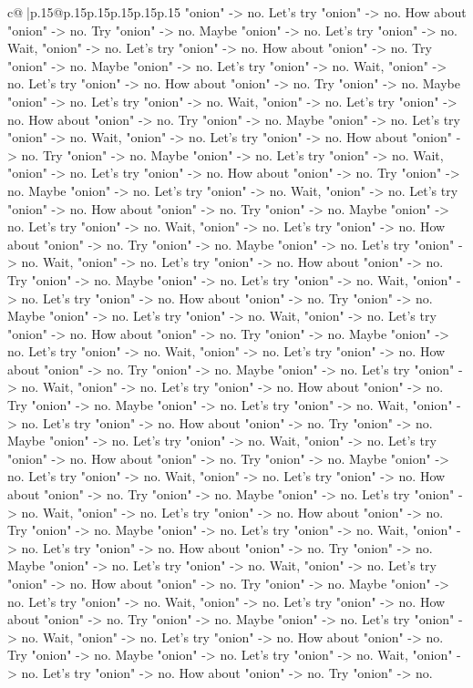 \documentclass{article}
\begin{document}
{\begin{supertabular}{c@{$\;$}|p{.15\linewidth}@{}p{.15\linewidth}p{.15\linewidth}p{.15\linewidth}p{.15\linewidth}p{.15\linewidth}}
{{{"onion" {-}> no. Let's try "onion" {-}> no. How about "onion" {-}> no. Try "onion" {-}> no. Maybe "onion" {-}> no. Let's try "onion" {-}> no. Wait, "onion" {-}> no. Let's try "onion" {-}> no. How about "onion" {-}> no. Try "onion" {-}> no. Maybe "onion" {-}> no. Let's try "onion" {-}> no. Wait, "onion" {-}> no. Let's try "onion" {-}> no. How about "onion" {-}> no. Try "onion" {-}> no. Maybe "onion" {-}> no. Let's try "onion" {-}> no. Wait, "onion" {-}> no. Let's try "onion" {-}> no. How about "onion" {-}> no. Try "onion" {-}> no. Maybe "onion" {-}> no. Let's try "onion" {-}> no. Wait, "onion" {-}> no. Let's try "onion" {-}> no. How about "onion" {-}> no. Try "onion" {-}> no. Maybe "onion" {-}> no. Let's try "onion" {-}> no. Wait, "onion" {-}> no. Let's try "onion" {-}> no. How about "onion" {-}> no. Try "onion" {-}> no. Maybe "onion" {-}> no. Let's try "onion" {-}> no. Wait, "onion" {-}> no. Let's try "onion" {-}> no. How about "onion" {-}> no. Try "onion" {-}> no. Maybe "onion" {-}> no. Let's try "onion" {-}> no. Wait, "onion" {-}> no. Let's try "onion" {-}> no. How about "onion" {-}> no. Try "onion" {-}> no. Maybe "onion" {-}> no. Let's try "onion" {-}> no. Wait, "onion" {-}> no. Let's try "onion" {-}> no. How about "onion" {-}> no. Try "onion" {-}> no. Maybe "onion" {-}> no. Let's try "onion" {-}> no. Wait, "onion" {-}> no. Let's try "onion" {-}> no. How about "onion" {-}> no. Try "onion" {-}> no. Maybe "onion" {-}> no. Let's try "onion" {-}> no. Wait, "onion" {-}> no. Let's try "onion" {-}> no. How about "onion" {-}> no. Try "onion" {-}> no. Maybe "onion" {-}> no. Let's try "onion" {-}> no. Wait, "onion" {-}> no. Let's try "onion" {-}> no. How about "onion" {-}> no. Try "onion" {-}> no. Maybe "onion" {-}> no. Let's try "onion" {-}> no. Wait, "onion" {-}> no. Let's try "onion" {-}> no. How about "onion" {-}> no. Try "onion" {-}> no. Maybe "onion" {-}> no. Let's try "onion" {-}> no. Wait, "onion" {-}> no. Let's try "onion" {-}> no. How about "onion" {-}> no. Try "onion" {-}> no. Maybe "onion" {-}> no. Let's try "onion" {-}> no. Wait, "onion" {-}> no. Let's try "onion" {-}> no. How about "onion" {-}> no. Try "onion" {-}> no. Maybe "onion" {-}> no. Let's try "onion" {-}> no. Wait, "onion" {-}> no. Let's try "onion" {-}> no. How about "onion" {-}> no. Try "onion" {-}> no. Maybe "onion" {-}> no. Let's try "onion" {-}> no. Wait, "onion" {-}> no. Let's try "onion" {-}> no. How about "onion" {-}> no. Try "onion" {-}> no. Maybe "onion" {-}> no. Let's try "onion" {-}> no. Wait, "onion" {-}> no. Let's try "onion" {-}> no. How about "onion" {-}> no. Try "onion" {-}> no. Maybe "onion" {-}> no. Let's try "onion" {-}> no. Wait, "onion" {-}> no. Let's try "onion" {-}> no. How about "onion" {-}> no. Try "onion" {-}> no. Maybe "onion" {-}> no. Let's try "onion" {-}> no. Wait, "onion" {-}> no. Let's try "onion" {-}> no. How about "onion" {-}> no. Try "onion" {-}> no. Maybe "onion" {-}> no. Let's try "onion" {-}> no. Wait, "onion" {-}> no. Let's try "onion" {-}> no. How about "onion" {-}> no. Try "onion" {-}> no. Maybe "onion" {-}> no. Let's try "onion" {-}> no. Wait, "onion" {-}> no. Let's try "onion" {-}> no. How about "onion" {-}> no. Try "onion" {-}> no. }}}
\end{supertabular}}
\end{document}
